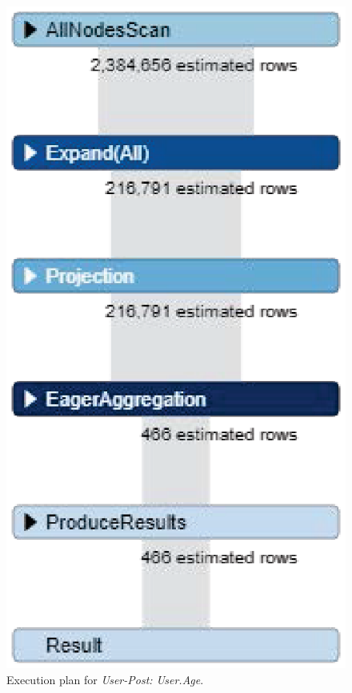 \begin{figure}[H]
	\centering
	\includegraphics[scale=0.7]{pic/wrong.eps}
	\caption{Execution plan for \textit{User-Post: User.Age}.}
	\label{fig:wrong1}
\end{figure}

